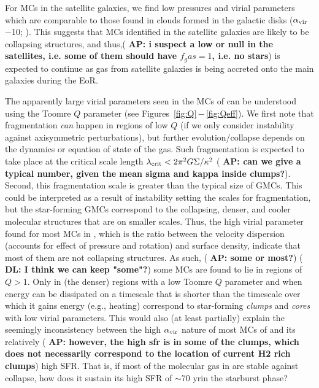 \IfFileExists{emulateapjlegacy.cls}{\documentclass[iop]{emulateapjlegacy}}{\documentclass[iop]{emulateapj}}
\newcommand{\AP}[1]{({\bf \color{apcolor} AP: #1})}
\newcommand{\DL}[1]{({\bf \color{dlcolor} DL: #1})}
\begin{document}
For MCs in the satellite galaxies, we find low pressures and virial parameters  which are comparable to those found in clouds formed in the galactic disks  ($\alpha_{\rm vir}$$-$10; \citealt{Dobbs08a, Tasker09a}).
This suggests that MCs identified in the satellite galaxies are likely to be collapsing structures, and thus,\AP{i suspect a low or null \SF in the satellites, i.e. some of them should have $f_gas = 1$, i.e. no stars} \SF is expected to continue as gas from satellite galaxies is being accreted onto the main galaxies during the EoR.

The apparently large virial parameters seen in the MCs of \flower can be understood using the Toomre $Q$ parameter (see Figures~\ref{fig:Q}\,$-$\,\ref{fig:Qeff}). We first note that fragmentation {\it can} happen in regions of low $Q$ (if we only consider instability against axisymmetric perturbations), but further evolution/collapse depends on the dynamics or equation of state of the gas.
%
Such fragmentation is expected to take place at the critical scale length $\lambda_{\rm crit} < 2 \pi^2 G \Sigma / \kappa^2$ \AP{can we give a typical number, given the mean sigma and kappa inside clumps?}. Second, this fragmentation scale is greater than the typical size of GMCs. This could be interpreted as a result of instability setting the scales for fragmentation, but the star-forming GMCs correspond to the collapsing, denser, and cooler molecular structures that are on smaller scales. 
%
Thus, the high virial parameter found for most MCs in \flower, which is the ratio between the velocity dispersion (accounts for effect of pressure and rotation) and surface density, indicate that most of them are not collapsing structures. As such, \AP{some or most?} 
\DL{I think we can keep "some"?}
some MCs are found to lie in regions of $Q>1$. 
Only in (the denser) regions with a low Toomre $Q$ parameter and when energy can be dissipated on a timescale that is shorter than the timescale over which it gains energy (e.g., heating) correspond to star-forming {\it clumps} and {\it cores} with low virial parameters.
%
This would also (at least partially) explain the seemingly inconsistency between the high $\alpha_{\rm vir}$ nature of most MCs of \flower and its relatively \AP{however, the high sfr is in some of the clumps, which does not necessarily correspond to the location of current H2 rich clumps} high SFR. That is, if most of the molecular gas in \flower are stable against collapse, how does it sustain its high SFR of $\sim$70\,\Msun\,yr\pmOne in the starburst phase?
\end{document}
